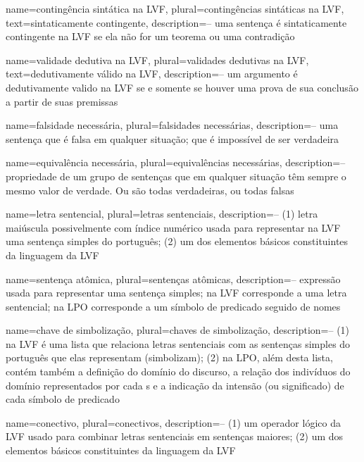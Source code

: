 {
 name={contingência sintática na LVF},
 plural={contingências sintáticas na LVF},
 text={sintaticamente contingente},
 description={-- uma sentença é sintaticamente contingente na LVF se ela não for um teorema ou uma contradição}
}

{
 name={validade dedutiva na LVF},
 plural={validades dedutivas na LVF},
 text={dedutivamente válido na LVF},
 description={-- um argumento é dedutivamente valido na LVF se e
somente se houver uma prova de sua conclusão a partir de suas premissas}
}

{
 name={falsidade necessária},
 plural={falsidades necessárias},
 description={-- uma sentença que é falsa em qualquer situação; que é impossível de ser verdadeira}
}

{
 name={equivalência necessária},
 plural={equivalências necessárias},
 description={-- propriedade de um grupo de sentenças que em qualquer situação têm sempre o mesmo valor de verdade. Ou são todas verdadeiras, ou todas falsas}
}

{
 name=letra sentencial,
 plural=letras sentenciais,
 description={-- (1) letra maiúscula possivelmente com índice numérico usada para representar na LVF uma sentença simples do português; (2) um dos elementos básicos constituintes da linguagem da LVF}
}

{
 name=sentença atômica,
 plural=sentenças atômicas,
 description={-- expressão usada para representar uma sentença simples; na LVF corresponde a uma letra sentencial; na LPO corresponde a um símbolo de predicado seguido de nomes}
}

{
 name=chave de simbolização,
 plural=chaves de simbolização,
 description={-- (1) na LVF é uma lista que relaciona letras sentenciais com as sentenças simples do português que elas representam (simbolizam); (2) na LPO, além desta lista, contém também a definição do domínio do discurso, a relação dos indivíduos do domínio representados por cada s e a indicação da intensão (ou significado) de cada símbolo de predicado}
}

{
 name=conectivo,
 plural=conectivos,
description={-- (1) um operador lógico da LVF usado para combinar letras sentenciais em sentenças maiores; (2) um dos elementos básicos constituintes da linguagem da LVF}
}

